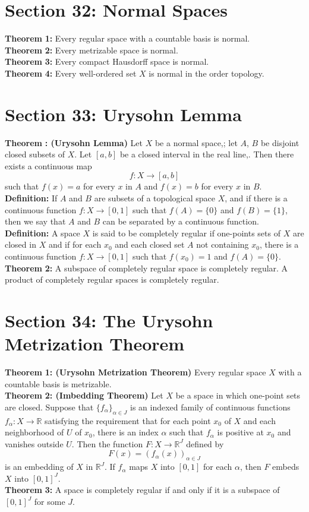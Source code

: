 \documentclass[12pt]{amsart}
\newcommand{\R}{\mathbb{R}}
\newcommand{\df}{\textbf{Definition: }}
\newcommand{\thm}{\textbf{Theorem }}
\begin{document}
\section*{Section 32: Normal Spaces}
\thm \textbf{1:} Every regular space with a countable basis is normal.\\
\indent \thm \textbf{2:} Every metrizable space is normal.\\
\indent \thm \textbf{3:} Every compact Hausdorff space is normal.\\
\indent \thm \textbf{4:} Every well-ordered set $X$ is normal in the order topology.\\
\pagebreak
\section*{Section 33: Urysohn Lemma}
\indent \thm \textbf{: (Urysohn Lemma)} Let $X$ be a normal space,; let $A$, $B$ be disjoint closed subsets of $X$. Let $[a,b]$ be a closed interval in the real line,. Then there exists a continuous map $$f:X \rightarrow [a,b]$$ such that $f(x)=a$ for every $x$ in $A$ and $f(x)=b$ for every $x$ in $B$.\\
\indent \df If $A$ and $B$ are subsets of a topological space $X$, and if there is a continuous function $f:X \rightarrow [0,1]$ such that $f(A)=\{0\}$ and $f(B)=\{1\}$, then we say that $A$ and $B$ can be separated by a continuous function.
\indent \df A space $X$ is said to be completely regular if one-points sets of $X$ are closed in $X$ and if for each $x_0$ and each closed set $A$ not containing $x_0$, there is a continuous function $f:X \rightarrow [0,1]$ such that $f(x_0)=1$ and $f(A)=\{0\}$.\\
\indent \thm \textbf{2:} A subspace of completely regular space is completely regular. A product of completely regular spaces is completely regular.
\section*{Section 34: The Urysohn Metrization Theorem}
\indent \thm \textbf{1: (Urysohn Metrization Theorem)} Every regular space $X$ with a countable basis is metrizable. \\
\indent \thm \textbf{2: (Imbedding Theorem)} Let $X$ be a space in which one-point sets are closed. Suppose that $\{f_\alpha\}_{\alpha\in J}$ is an indexed family of continuous functions $f_\alpha: X \rightarrow \R $ satisfying the requirement that for each point $x_0$ of $X$ and each neighborhood of $U$ of $x_0$, there is an index $\alpha$ such that $f_\alpha$ is positive at $x_0$ and vanishes outside $U$. Then the function $F:X\rightarrow \R^J$ defined by 
\[F(x)= (f_\alpha(x))_{\alpha\in J}\]
is an embedding of $X$ in $\R^J$. If $f_\alpha$ maps $X$ into $[0,1]$ for each $\alpha$, then $F$ embeds $X$ into $[0,1]^J$.\\
\indent \thm \textbf{3:} A space is completely regular if and only if it is a subspace of $[0,1]^J$ for some $J$.
\end{document}
